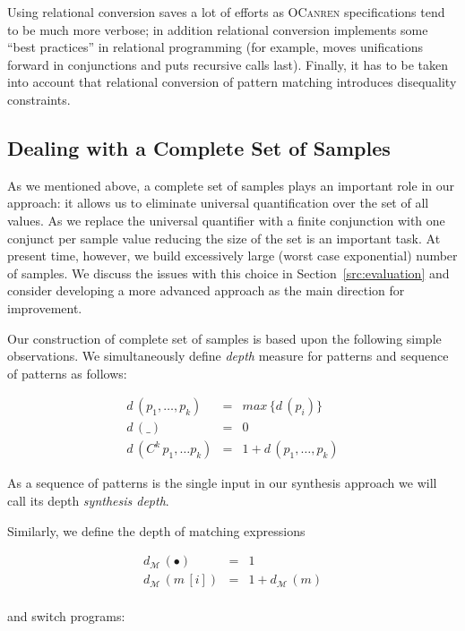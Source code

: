 Using relational conversion saves a lot of efforts as \textsc{OCanren} specifications tend to be much more verbose; in addition
relational conversion implements some ``best practices'' in relational programming (for example, moves unifications forward in
conjunctions and puts recursive calls last). Finally, it has to be taken into account that relational conversion of pattern matching introduces
disequality constraints.

\subsection{Dealing with a Complete Set of Samples}
\label{sec:samples}

As we mentioned above, a complete set of samples plays an important role in our approach: it allows us to eliminate universal quantification over the
set of all values. As we replace the universal quantifier with a finite conjunction with one conjunct per sample value reducing the size of
the set is an important task. At present time, however, we build excessively large (worst case exponential) number of samples. We discuss
the issues with this choice in Section~\ref{src:evaluation} and consider developing a more advanced approach as the main direction for
improvement.

Our construction of complete set of samples is based upon the following simple observations. We simultaneously define \emph{depth} measure
for patterns and sequence of patterns as follows:

\[
\begin{array}{rcl}
   d\,(p_1,\dots,p_k)     & = & max\, \{ d\,(p_i)\}\\
   d\,(\_)                 & = & 0 \\
   d\,(C^k\,p_1,\dots p_k) & = & 1 + d\,(p_1,\dots,p_k)
\end{array}
\]

As a sequence of patterns is the single input in our synthesis approach we will call its depth \emph{synthesis depth}.

Similarly, we define the depth of matching expressions

\[
\begin{array}{rcl}
  d_{\mathcal M}\,(\bullet) & = & 1 \\
  d_{\mathcal M}\,(m\,[i]) & = & 1 + d_{\mathcal M}\,(m)\\
\end{array}
\]

and switch programs:

